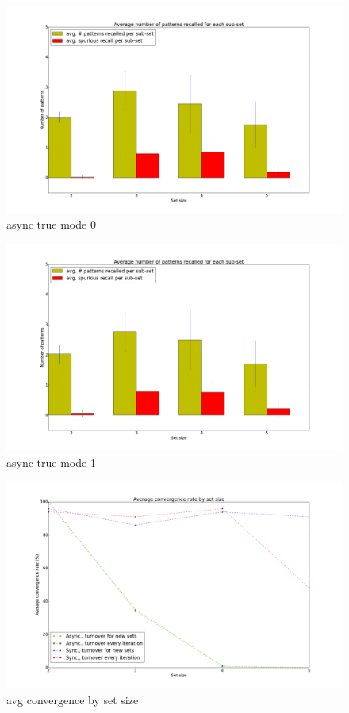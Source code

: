 \begin{figure}[h!]
    \centering
    \includegraphics[width=13cm]{fig/async_true_mode_0.png}
    \caption{async true mode 0}
    \label{fig:async_true_mode_0}
\end{figure}

\begin{figure}[h!]
    \centering
    \includegraphics[width=13cm]{fig/async_true_mode_1.png}
    \caption{async true mode 1}
    \label{fig:async_true_mode_1}
\end{figure}

\begin{figure}[h!]
    \centering
    \includegraphics[width=13cm]{fig/avg_convergence_rate.png}
    \caption{avg convergence by set size}
    \label{fig:avg_convergence_rate}
\end{figure}

